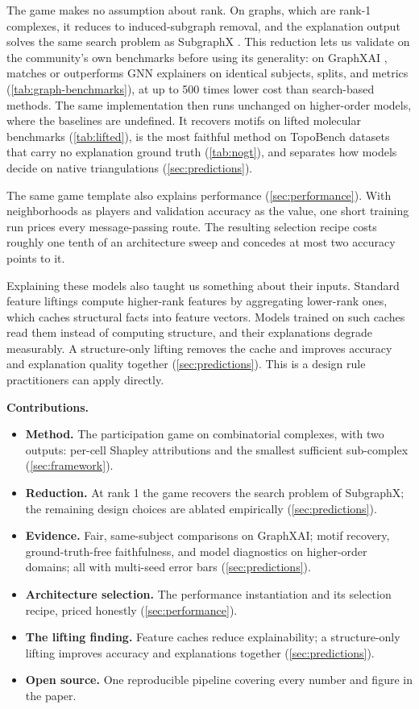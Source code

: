 The game makes no assumption about rank. On graphs, which are rank-1
complexes, it reduces to induced-subgraph removal, and the explanation
output solves the same search problem as SubgraphX
\citep{yuan2021subgraphx}. This reduction lets us validate \method on
the community's own benchmarks before using its generality: on GraphXAI
\citep{agarwal2023graphxai}, \method matches or outperforms GNN
explainers on identical subjects, splits, and metrics
(\cref{tab:graph-benchmarks}), at up to 500 times lower cost than
search-based methods. The same implementation then runs unchanged on
higher-order models, where the baselines are undefined. It recovers
motifs on lifted molecular benchmarks (\cref{tab:lifted}), is the most
faithful method on TopoBench datasets that carry no explanation ground
truth (\cref{tab:nogt}), and separates how models decide on native
triangulations (\cref{sec:predictions}).

The same game template also explains performance
(\cref{sec:performance}). With neighborhoods as players and validation
accuracy as the value, one short training run prices every
message-passing route. The resulting selection recipe costs roughly one
tenth of an architecture sweep and concedes at most two accuracy
points to it.

Explaining these models also taught us something about their inputs.
Standard feature liftings compute higher-rank features by aggregating
lower-rank ones, which caches structural facts into feature vectors.
Models trained on such caches read them instead of computing structure,
and their explanations degrade measurably. A structure-only lifting
removes the cache and improves accuracy and explanation quality
together (\cref{sec:predictions}). This is a design rule practitioners
can apply directly.

\textbf{Contributions.}
\begin{itemize}
  \item \textbf{Method.} The participation game on combinatorial
    complexes, with two outputs: per-cell Shapley attributions and the
    smallest sufficient sub-complex (\cref{sec:framework}).
  \item \textbf{Reduction.} At rank 1 the game recovers the search
    problem of SubgraphX; the remaining design choices are ablated
    empirically (\cref{sec:predictions}).
  \item \textbf{Evidence.} Fair, same-subject comparisons on GraphXAI;
    motif recovery, ground-truth-free faithfulness, and model
    diagnostics on higher-order domains; all with multi-seed error
    bars (\cref{sec:predictions}).
  \item \textbf{Architecture selection.} The performance
    instantiation and its selection recipe, priced honestly
    (\cref{sec:performance}).
  \item \textbf{The lifting finding.} Feature caches reduce
    explainability; a structure-only lifting improves accuracy and
    explanations together (\cref{sec:predictions}).
  \item \textbf{Open source.} One reproducible pipeline covering every
    number and figure in the paper.
\end{itemize}

